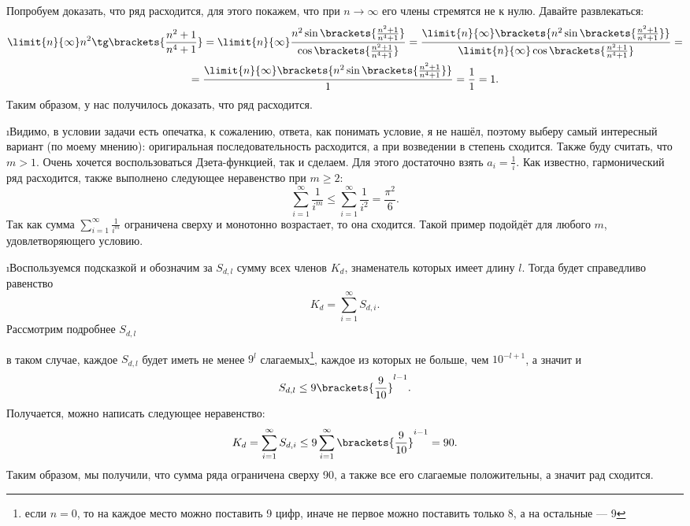\pu Попробуем доказать, что ряд расходится, для этого покажем, что при $n \to \infty$ его члены стремятся не к нулю. Давайте развлекаться:
\begin{gather*}
    \limit{n}{\infty} n^2\tg\brackets{\frac{n^2+1}{n^4+1}} = \limit{n}{\infty} \frac{n^2\sin\brackets{\frac{n^2+1}{n^4+1}}}{\cos\brackets{\frac{n^2+1}{n^4+1}}} = 
    \frac{\limit{n}{\infty} \brackets{n^2\sin\brackets{\frac{n^2+1}{n^4+1}}}}{\limit{n}{\infty} \cos\brackets{\frac{n^2+1}{n^4+1}}} = \\ = 
    \frac{\limit{n}{\infty} \brackets{n^2\sin\brackets{\frac{n^2+1}{n^4+1}}}}{1} = \frac{1}{1} = 1.
\end{gather*}
Таким образом, у нас получилось доказать, что ряд расходится.


\i Видимо, в условии задачи есть опечатка, к сожалению, ответа, как понимать условие, я не нашёл, поэтому выберу самый интересный вариант (по моему мнению): 
оригиральная последовательность расходится, а при возведении в степень сходится. Также буду считать, что $m > 1$. Очень хочется воспользоваться Дзета-функцией,
так и сделаем. Для этого достаточно взять $a_i = \frac{1}{i}$. Как известно, гармонический ряд расходится, также выполнено следующее неравенство при $m \geq 2$:
    \[\sum_{i=1}^{\infty} \frac{1}{i^m} \leq \sum_{i=1}^{\infty} \frac{1}{i^2} = \frac{\pi^2}{6}.\]
Так как сумма $\sum_{i=1}^{\infty} \frac{1}{i^m}$ ограничена сверху и монотонно возрастает, то она сходится.
Такой пример подойдёт для любого $m$, удовлетворяющего условию.


\i Воспользуемся подсказкой и обозначим за $S_{d, l}$ сумму всех членов $K_d$, знаменатель которых имеет длину $l$. Тогда будет справедливо равенство
    \[K_d = \sum_{i=1}^{\infty} S_{d, i}.\]
Рассмотрим подробнее $S_{d, l}$

в таком случае, каждое $S_{d, l}$ будет иметь не менее $9^{l}$ слагаемых\footnote{если $n = 0$, то на каждое место можно поставить 9 цифр, 
иначе не первое можно поставить только 8, а на остальные --- 9}, каждое из которых не больше, чем $10^{-l+1}$, а значит и 
    \[S_{d, l} \leq 9\brackets{\frac{9}{10}}^{l-1}.\]
Получается, можно написать следующее неравенство:
    \[K_d = \sum_{i=1}^{\infty} S_{d, i} \leq 9\sum_{i=1}^{\infty}\brackets{\frac{9}{10}}^{i-1} = 90.\]
Таким образом, мы получили, что сумма ряда ограничена сверху 90, а также все его слагаемые положительны, а значит рад сходится.

